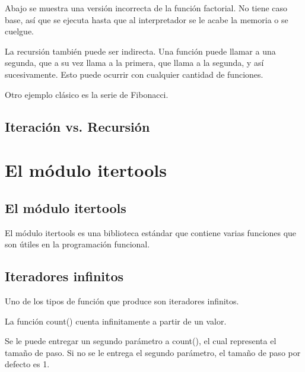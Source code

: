 \documentclass{report}
\begin{document}
Abajo se muestra una versión incorrecta de la función factorial. No tiene caso base, así que se ejecuta hasta que al interpretador se le acabe la memoria o se cuelgue.


La recursión también puede ser indirecta. Una función puede llamar a una segunda, que a su vez llama a la primera, que llama a la segunda, y así sucesivamente. Esto puede ocurrir con cualquier cantidad de funciones.


Otro ejemplo clásico es la serie de Fibonacci.


\section{Iteración vs. Recursión}

\clearpage\chapter{El módulo itertools}

\section{El módulo itertools}

El módulo itertools es una biblioteca estándar que contiene varias funciones que son útiles en la programación funcional.


\section{Iteradores infinitos}

Uno de los tipos de función que produce son iteradores infinitos.\smallskip

La función count() cuenta infinitamente a partir de un valor.


Se le puede entregar un segundo parámetro a count(), el cual representa el tamaño de paso. Si no se le entrega el segundo parámetro, el tamaño de paso por defecto es 1.

\end{document}
